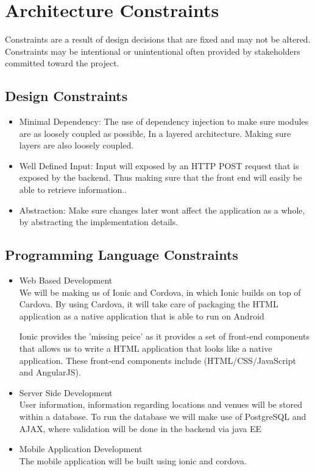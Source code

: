\documentclass{article}
\begin{document}
\section{Architecture Constraints}
	Constraints are a result of design decisions that are fixed and may not be altered. Constraints may be intentional or unintentional often provided by stakeholders committed toward the project.
	
		\subsection{Design Constraints}
		\begin{itemize}
			
			\item Minimal Dependency:
			The use of dependency injection to make sure modules are as loosely coupled as possible, In a layered architecture. Making sure layers are also loosely coupled.
			
			\item Well Defined Input:
			Input will exposed by an HTTP POST request  that is exposed by the backend. Thus making sure that the front end will easily be able to retrieve information..
			
			\item Abstraction:
			Make sure changes later wont affect the application as a whole, by abstracting the implementation details.
		\end{itemize}
		
		\subsection{Programming Language Constraints}
			\begin{itemize}
 				\item Web Based Development
 				\bigskip
 				\\ 				
 				We will be making us of Ionic and Cordova, in which Ionic builds on top of Cardova. By using Cardova, it will take care of packaging the HTML application as a native application that is able to run on Android
				
				Ionic provides the 'missing peice' as it provides a set of front-end components that allows us to write a HTML application that looks like a native application. These front-end components include (HTML/CSS/JavaScript and AngularJS).
 				
  				\item Server Side Development
  				\bigskip
				\\
 				User information, information regarding locations and venues will be stored within a database. To run the database we will make use of PostgreSQL and AJAX, where validation will be done in the backend via java EE
 				
 				\item Mobile Application  Development
  				\bigskip
 				\\
 				The mobile application will be built using ionic and cordova.
 							
			\end{itemize}
\end{document}
